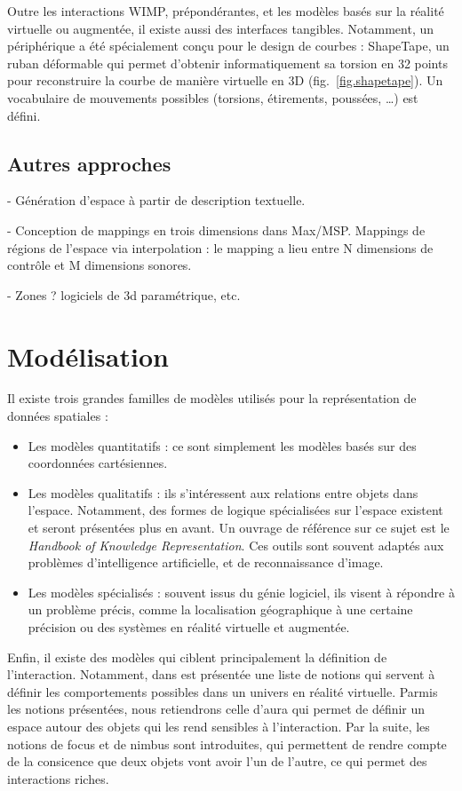 \documentclass[french,12pt]{article}
\begin{document}
Outre les interactions \ac{WIMP}, prépondérantes, et les modèles basés sur la réalité virtuelle ou augmentée, il existe aussi des interfaces tangibles. Notamment, un périphérique a été spécialement conçu pour le design de courbes : ShapeTape\cite{grossman_interface_2003}, un ruban déformable qui permet d'obtenir informatiquement sa torsion en 32 points pour reconstruire la courbe de manière virtuelle en 3D (fig.~\ref{fig.shapetape}). Un vocabulaire de mouvements possibles (torsions, étirements, poussées, \dots) est défini.

\subsection{Autres approches}
- Génération d'espace à partir de description textuelle.
\cite{andriamarozakaniaina_du_2012} 

- Conception de mappings en trois dimensions dans Max/MSP. 
Mappings de régions de l'espace via interpolation :
 le mapping a lieu entre N dimensions de contrôle et M dimensions sonores.
\cite{van_nort_lom_2006}

 - Zones ? logiciels de 3d paramétrique, etc. 

\newpage
\section{Modélisation}
Il existe trois grandes familles de modèles utilisés pour la représentation de données spatiales : 
\begin{itemize}
\item Les modèles quantitatifs : ce sont simplement les modèles basés sur des coordonnées cartésiennes. 
\item Les modèles qualitatifs : ils s'intéressent aux relations entre objets dans l'espace. Notamment, des formes de logique spécialisées sur l'espace existent et seront présentées plus en avant. Un ouvrage de référence sur ce sujet est le \textit{Handbook of Knowledge Representation}\cite{porter_handbook_2008}. Ces outils sont souvent adaptés aux problèmes d'intelligence artificielle, et de reconnaissance d'image.
\item Les modèles spécialisés : souvent issus du génie logiciel, ils visent à répondre à un problème précis, comme la localisation géographique à une certaine précision ou des systèmes en réalité virtuelle et augmentée.
\end{itemize}

Enfin, il existe des modèles qui ciblent principalement la définition de l'interaction. Notamment, dans \cite{benford_spatial_1993} est présentée une liste de notions qui servent 
à définir les comportements possibles dans un univers en réalité virtuelle. Parmis les notions présentées, nous retiendrons celle d'aura qui permet de définir un espace autour des 
objets qui les rend sensibles à l'interaction. Par la suite, les notions de focus et de nimbus sont introduites, qui permettent de rendre compte 
de la consicence que deux objets vont avoir l'un de l'autre, ce qui permet des interactions riches.
\end{document}
